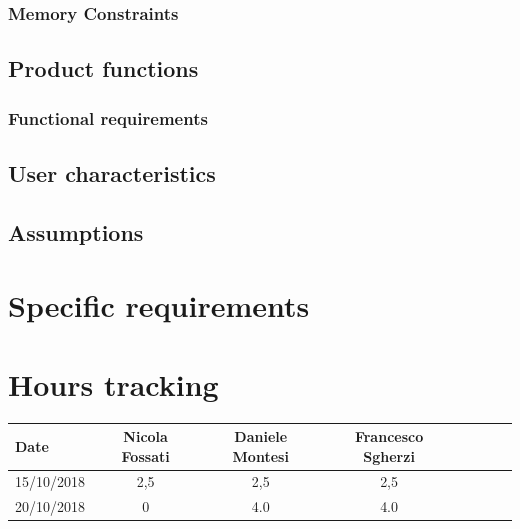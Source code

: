 \documentclass[a4paper,oneside,11pt]{article}
\begin{document}
            \subsubsection{Memory Constraints}
                
        
        
        
        \subsection{Product functions}
            
            \subsubsection{Functional requirements}
                
        \subsection{User characteristics}
        \subsection{Assumptions}
        
        
    \section{Specific requirements}
    
        \section{Hours tracking}
        \begin{tabular}{l*{6}{c}r}
            Date & Nicola Fossati & Daniele Montesi & Francesco Sgherzi \\
            \hline
            15/10/2018 & 2,5 & 2,5 & 2,5   \\
            \hline
            20/10/2018 & 0 & 4.0 & 4.0 \\
        \end{tabular}
\end{document}
